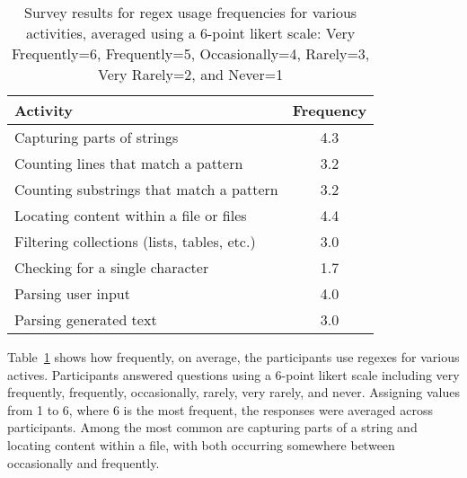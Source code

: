\begin{table}
\caption{Survey results for regex usage frequencies for various activities, averaged using a 6-point likert scale: Very Frequently=6, Frequently=5, Occasionally=4, Rarely=3, Very Rarely=2, and Never=1 \label{tab:regexactivities}}
\begin{center}
\begin{tabular}{l|c}
Activity & Frequency \\ \hline
Capturing parts of strings & 4.3 \\ 
Counting lines that match a pattern & 3.2\\
Counting  substrings that match a pattern & 3.2\\
Locating content within a file or files & 4.4\\
Filtering collections (lists, tables, etc.) & 3.0 \\
Checking for a single character & 1.7\\
Parsing user input & 4.0\\
Parsing generated text & 3.0\\

\end{tabular}
\end{center}
\end{table}

Table~\ref{tab:regexactivities} shows how frequently, on average, the participants use 
regexes for various actives. 
Participants answered questions using a 6-point likert scale including very frequently, frequently, occasionally, rarely, very rarely, and never. 
Assigning values from 1 to 6, where 6 is the most frequent, the responses were averaged across participants. 
Among the most common are capturing parts of a string and locating content within a file, with both occurring somewhere between occasionally and frequently. 


